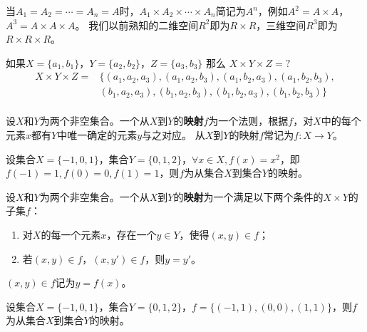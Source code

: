 \documentclass{beamer}
\begin{document}
\begin{CJK*}{UTF8}{gbsn}
\begin{frame}
\begin{Def}
当$A_1=A_2=\cdots=A_n=A$时，$A_1 \times A_2\times \cdots \times A_n$简记为$A^n$，例如$A^2=A\times A$，$A^3=A\times A\times A$。
我们以前熟知的二维空间$R^2$即为$R\times R$，三维空间$R^3$即为$R\times R\times R$。
\end{Def}
\end{frame}
\begin{frame}
    \begin{Ex}
    如果$X=\{a_1,b_1\}$，$Y=\{a_2,b_2\}$，$Z=\{a_3,b_3\}$ 那么 $X \times Y \times Z = ?$
    \begin{equation*}
      \begin{split}
       X \times Y \times Z =& \{ (a_1,a_2, a_3), (a_1,a_2, b_3), (a_1, b_2, a_3), (a_1,b_2, b_3), \\
&(b_1, a_2, a_3), (b_1, a_2, b_3), (b_1, b_2, a_3), (b_1, b_2, b_3) \}\\
      \end{split}
    \end{equation*}
  \end{Ex}
\end{frame}
\begin{frame}
    \begin{Def}
    设$X$和$Y$为两个非空集合。一个从$X$到$Y$的{\bfseries 映射}$f$为一个法则，根据$f$，对$X$中的每个元素$x$都有$Y$中唯一确定的元素$y$与之对应。
    从$X$到$Y$的映射$f$常记为$f:X\to Y$。
  \end{Def}
  \begin{Ex}
    设集合$X=\{-1,0,1\}$，集合$Y=\{0,1,2\}$，$\forall x \in X, f(x)=x^2$，即$f(-1)=1,f(0)=0,f(1)=1$，则$f$为从集合$X$到集合$Y$的映射。
  \end{Ex}
\end{frame}
\begin{frame}
    \begin{Def}
    设$X$和$Y$为两个非空集合。一个从$X$到$Y$的{\bfseries 映射}为一个满足以下两个条件的$X\times Y$的子集$f$：
    \begin{enumerate}
    \item 对$X$的每一个元素$x$，存在一个$y\in Y$，使得$(x,y) \in f$；
    \item 若$(x,y)\in f$，$(x,y')\in f$，则$y=y'$。
    \end{enumerate}
    $(x,y)\in f$记为$y=f(x)$。
  \end{Def}
  \begin{Ex}\justifying\let\raggedright\justifying
    设集合$X=\{-1,0,1\}$，集合$Y=\{0,1,2\}$，$f=\{(-1,1),(0,0),(1,1)\}$，则$f$为从集合$X$到集合$Y$的映射。
  \end{Ex}

\end{frame}
\end{CJK*}
\end{document}
